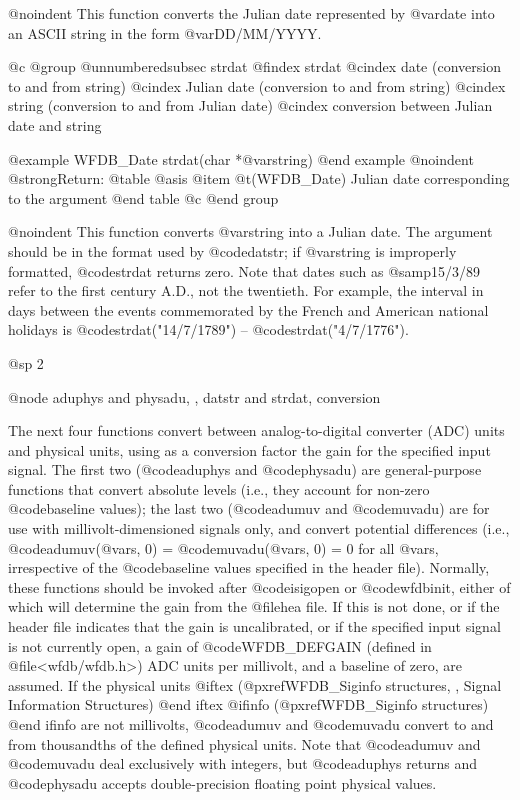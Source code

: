 {{{{{{{{{@noindent
This function converts the Julian date represented by @var{date} into
an ASCII string in the form @var{DD/MM/YYYY}.

@c @group
@unnumberedsubsec strdat
@findex strdat
@cindex date (conversion to and from string)
@cindex Julian date (conversion to and from string)
@cindex string (conversion to and from Julian date)
@cindex conversion between Julian date and string

@example
WFDB_Date strdat(char *@var{string})
@end example
@noindent
@strong{Return:}
@table @asis
@item @t{(WFDB_Date)}
Julian date corresponding to the argument
@end table
@c @end group

@noindent
This function converts @var{string} into a Julian date.  The argument
should be in the format used by @code{datstr}; if @var{string} is
improperly formatted, @code{strdat} returns zero.  Note that dates such
as @samp{15/3/89} refer to the first century A.D., not the twentieth.
For example, the interval in days between the events commemorated by the
French and American national holidays is @code{strdat("14/7/1789")} --
@code{strdat("4/7/1776")}.

@sp 2

@node aduphys and physadu, , datstr and strdat, conversion

The next four functions convert between analog-to-digital converter
(ADC) units and physical units, using as a conversion factor the gain
for the specified input signal.  The first two (@code{aduphys} and
@code{physadu}) are general-purpose functions that convert absolute
levels (i.e., they account for non-zero @code{baseline} values); the
last two (@code{adumuv} and @code{muvadu}) are for use with
millivolt-dimensioned signals only, and convert potential differences
(i.e., @code{adumuv(@var{s}, 0)} = @code{muvadu(@var{s}, 0)} = 0 for all
@var{s}, irrespective of the @code{baseline} values specified in the
header file).  Normally, these functions should be invoked after
@code{isigopen} or @code{wfdbinit}, either of which will determine the
gain from the @file{hea} file.  If this is not done, or if the
header file indicates that the gain is uncalibrated, or if the
specified input signal is not currently open, a gain of @code{WFDB_DEFGAIN}
(defined in @file{<wfdb/wfdb.h>}) ADC units per millivolt, and a baseline
of zero, are assumed.  If the physical units
@iftex
(@pxref{WFDB_Siginfo structures, , Signal Information Structures})
@end iftex
@ifinfo
(@pxref{WFDB_Siginfo structures})
@end ifinfo
are not millivolts, @code{adumuv} and @code{muvadu} convert to and from
thousandths of the defined physical units.  Note that @code{adumuv} and
@code{muvadu} deal exclusively with integers, but @code{aduphys} returns
and @code{physadu} accepts double-precision floating point physical
values.

}}}}}}}}}
